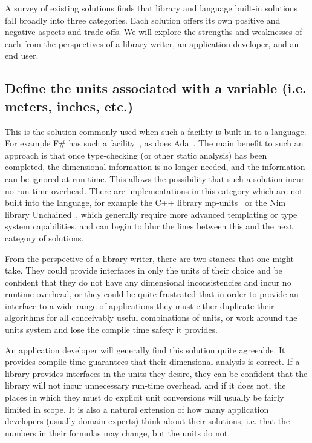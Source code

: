 \documentclass{article}
\begin{document}
A survey of existing solutions finds that library and language built-in solutions fall broadly into three categories.
Each solution offers its own positive and negative aspects and trade-offs.
We will explore the strengths and weaknesses of each from the perspectives of a library writer, an application developer, and an end user.

\subsection{Define the units associated with a variable (i.e. meters, inches, etc.)}
\label{static-units}

This is the solution commonly used when such a facility is built-in to a language.
For example F# has such a facility~\cite{FSharpUnitsofMeasure2020}, as does Ada~\cite{DimensionalityCheckingAda}.
The main benefit to such an approach is that once type-checking (or other static analysis) has been completed,
the dimensional information is no longer needed, and the information can be ignored at run-time.
This allows the possibility that such a solution incur no run-time overhead.
There are implementations in this category which are not built into the language,
for example the C++ library mp-units~\cite{mpunits} or the Nim library Unchained~\cite{SciNimUnchained},
which generally require more advanced templating or type system capabilities,
and can begin to blur the lines between this and the next category of solutions.

From the perspective of a library writer, there are two stances that one might take.
They could provide interfaces in only the units of their choice and be confident that they do not have any dimensional inconsistencies and incur no runtime overhead,
or they could be quite frustrated that in order to provide an interface to a wide range of applications they must either duplicate their algorithms for all conceivably useful combinations of units, or work around the units system and lose the compile time safety it provides.

An application developer will generally find this solution quite agreeable.
It provides compile-time guarantees that their dimensional analysis is correct.
If a library provides interfaces in the units they desire, they can be confident that the library will not incur unnecessary run-time overhead,
and if it does not, the places in which they must do explicit unit conversions will usually be fairly limited in scope.
It is also a natural extension of how many application developers (usually domain experts) think about their solutions,
i.e. that the numbers in their formulas may change, but the units do not.
\end{document}
